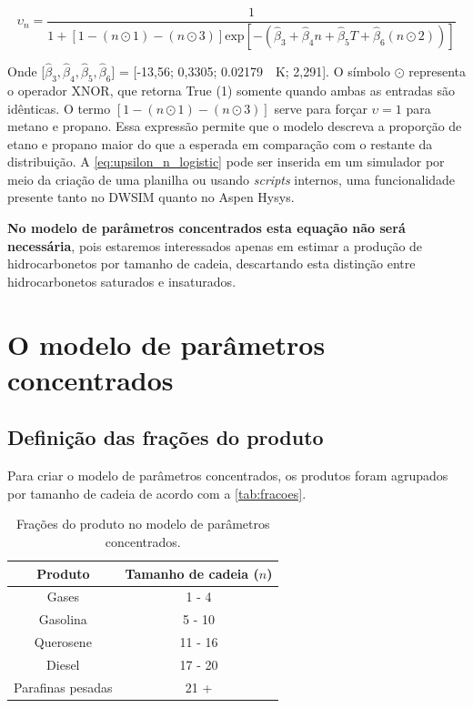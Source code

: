 \documentclass[portuguese,12pt,a4paper,onecolumn]{article}
\begin{document}
	\begin{equation}
		\upsilon_n = \frac{1}{1 + [1 - (n \odot 1) - (n \odot 3)] \mathrm{exp}[-(\hat{\beta}_3 + \hat{\beta}_4 n + \hat{\beta}_5 T + \hat{\beta}_6 (n \odot 2))]}
		\label{eq:upsilon_n_logistic}
	\end{equation}
	
	Onde [$\hat{\beta}_3, \hat{\beta}_4, \hat{\beta}_5, \hat{\beta}_6$] = [-13,56; 0,3305; \qty{0,02179}{\per \kelvin}; 2,291]. O símbolo $\odot$ representa o operador XNOR, que retorna True (1) somente quando ambas as entradas são idênticas. O termo $[1 - (n \odot 1) - (n \odot 3)]$ serve para forçar $\upsilon = 1$ para metano e propano. Essa expressão permite que o modelo descreva a proporção de etano e propano maior do que a esperada em comparação com o restante da distribuição. A \autoref{eq:upsilon_n_logistic} pode ser inserida em um simulador por meio da criação de uma planilha ou usando \textit{scripts} internos, uma funcionalidade presente tanto no DWSIM quanto no Aspen Hysys.
	
	\textbf{No modelo de parâmetros concentrados esta equação não será necessária}, pois estaremos interessados apenas em estimar a produção de hidrocarbonetos por tamanho de cadeia, descartando esta distinção entre hidrocarbonetos saturados e insaturados.
	
	\newpage
	
	\section{O modelo de parâmetros concentrados}
	\label{lumped_model}
	
	\subsection{Definição das frações do produto}
	
	Para criar o modelo de parâmetros concentrados, os produtos foram agrupados por tamanho de cadeia de acordo com a \autoref{tab:fracoes}.
	
	\begin{table}[!h]
		\centering
		\caption{Frações do produto no modelo de parâmetros concentrados.}
		\label{tab:fracoes}
		\begin{tabular}{cc}
			\hline
			Produto & Tamanho de cadeia ($n$) \\
			\hline
			Gases & 1 - 4 \\
			Gasolina & 5 - 10 \\
			Querosene & 11 - 16 \\
			Diesel & 17 - 20 \\
			Parafinas pesadas & 21 + \\
			\hline
		\end{tabular}
	\end{table}
	
\end{document}
